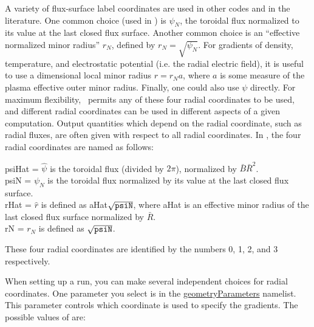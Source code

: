 A variety of flux-surface label coordinates are used in other codes and in the literature.
One common choice (used in \vmec) is $\psi_N$, the toroidal flux normalized to its
value at the last closed flux surface.  Another common choice is an ``effective normalized minor radius''
$r_N$, defined by $r_N=\sqrt{\psi_N}$.  For gradients of density, temperature, and electrostatic potential (i.e. the radial
electric field), it is useful to use a dimensional local minor radius $r = r_N a$, where $a$ is some
measure of the plasma effective outer minor radius.  Finally, one could also use $\psi$ directly.
For maximum flexibility, \sfincs~permits any of these four radial coordinates to be used, and different radial
coordinates can be used in different aspects of a given computation.  Output quantities which depend
on the radial coordinate, such as radial fluxes, are often given with respect to all radial coordinates.
In \sfincs, the four radial coordinates are named as follows:\\

{\setlength{\parindent}{0cm}

{\ttfamily \hypertarget{psiHat}{psiHat}} = $\hat\psi$ is the toroidal flux (divided by $2\pi$), normalized by $\bar{B}\bar{R}^2$.\\

{\ttfamily \hypertarget{psiN}{psiN}} = $\psi_N$ is the toroidal flux normalized by its value at the last closed flux surface.\\

{\ttfamily \hypertarget{rHat}{rHat}} = $\hat{r}$ is defined as {\ttfamily aHat}$\sqrt{\mbox{\ttfamily psiN}}$, where {\ttfamily aHat} is an effective minor radius of the last closed flux surface normalized by $\bar{R}$.\\

{\ttfamily \hypertarget{rN}{rN}} = $r_N$ is defined as $\sqrt{\mbox{\ttfamily psiN}}$.\\

}

These four radial coordinates are identified by the numbers 0, 1, 2, and 3 respectively.

When setting up a run, you can make several independent choices for radial coordinates.  One parameter
you select is  in the 
{\ttfamily \hyperref[sec:geometryParameters]{geometryParameters}} namelist.
This parameter controls which coordinate is used to specify the gradients. The possible values of  are:\\

